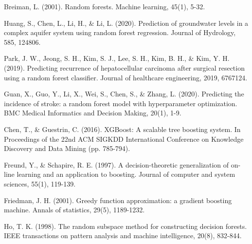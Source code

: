 Breiman, L. (2001). Random forests. Machine learning, 45(1), 5-32.

Huang, S., Chen, L., Li, H., \& Li, L. (2020). Prediction of groundwater
levels in a complex aquifer system using random forest regression.
Journal of Hydrology, 585, 124806.

Park, J. W., Jeong, S. H., Kim, S. J., Lee, S. H., Kim, B. H., \& Kim,
Y. H. (2019). Predicting recurrence of hepatocellular carcinoma after
surgical resection using a random forest classifier. Journal of
healthcare engineering, 2019, 6767124.

Guan, X., Guo, Y., Li, X., Wei, S., Chen, S., \& Zhang, L. (2020).
Predicting the incidence of stroke: a random forest model with
hyperparameter optimization. BMC Medical Informatics and Decision
Making, 20(1), 1-9.

Chen, T., \& Guestrin, C. (2016). XGBoost: A scalable tree boosting
system. In Proceedings of the 22nd ACM SIGKDD International Conference
on Knowledge Discovery and Data Mining (pp. 785-794).

Freund, Y., \& Schapire, R. E. (1997). A decision-theoretic
generalization of on-line learning and an application to boosting.
Journal of computer and system sciences, 55(1), 119-139.

Friedman, J. H. (2001). Greedy function approximation: a gradient
boosting machine. Annals of statistics, 29(5), 1189-1232.

Ho, T. K. (1998). The random subspace method for constructing decision
forests. IEEE transactions on pattern analysis and machine intelligence,
20(8), 832-844.
